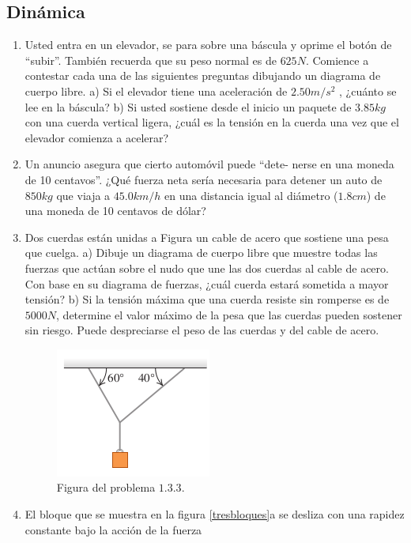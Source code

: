 \subsection{Dinámica}
	\begin{enumerate}
		\item Usted entra en un elevador, se para sobre una báscula y oprime
el botón de “subir”. También recuerda que su peso normal es de $625 N$.
Comience a contestar cada una de las siguientes preguntas dibujando
un diagrama de cuerpo libre. a) Si el elevador tiene una aceleración de
$2.50 m/s^2$ , ¿cuánto se lee en la báscula? b) Si usted sostiene desde el
inicio un paquete de $3.85 kg$ con una cuerda vertical ligera, ¿cuál es la
tensión en la cuerda una vez que el elevador comienza a acelerar?
		\item Un anuncio asegura que cierto automóvil puede “dete-
nerse en una moneda de 10 centavos”. ¿Qué fuerza neta sería necesaria
para detener un auto de $850 kg$ que viaja a $45.0 km/h$ en una distancia
igual al diámetro ($1.8 cm$) de una moneda de 10 centavos de dólar?
			\pagebreak
		\item 
\begin{multicols}{2}
Dos cuerdas están unidas a Figura un cable de acero que sostiene una
pesa que cuelga. a) Dibuje un diagrama
de cuerpo libre que muestre todas las
fuerzas que actúan sobre el nudo que
une las dos cuerdas al cable de acero.
Con base en su diagrama de fuerzas,
¿cuál cuerda estará sometida a mayor
tensión? b) Si la tensión máxima que una cuerda resiste sin romperse
es de $5000 N$, determine el valor máximo de la pesa que las cuerdas
pueden sostener sin riesgo. Puede despreciarse el peso de las cuerdas y
del cable de acero.
\columnbreak
\begin{figure}[H]
	\centering
	\includegraphics[scale=0.6]{Images/tension.png}
	\caption{Figura del problema $1.3.3.$}
	\label{1.3.2.}
\end{figure}
\end{multicols}
		\item El bloque que se muestra en la figura \ref{tresbloques}a se desliza con una rapidez constante bajo la acción de la fuerza

\end{enumerate}

